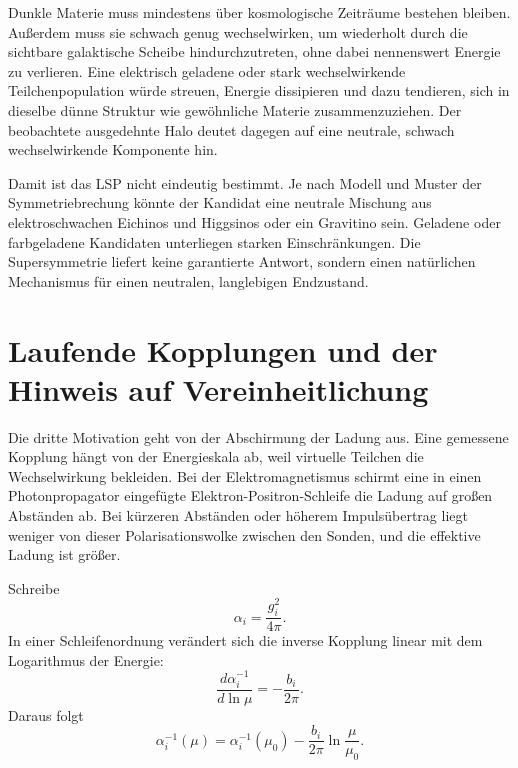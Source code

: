 Dunkle Materie muss mindestens über kosmologische Zeiträume bestehen bleiben. Außerdem muss sie schwach genug wechselwirken, um wiederholt durch die sichtbare galaktische Scheibe hindurchzutreten, ohne dabei nennenswert Energie zu verlieren. Eine elektrisch geladene oder stark wechselwirkende Teilchenpopulation würde streuen, Energie dissipieren und dazu tendieren, sich in dieselbe dünne Struktur wie gewöhnliche Materie zusammenzuziehen. Der beobachtete ausgedehnte Halo deutet dagegen auf eine neutrale, schwach wechselwirkende Komponente hin.

Damit ist das LSP nicht eindeutig bestimmt. Je nach Modell und Muster der Symmetriebrechung könnte der Kandidat eine neutrale Mischung aus elektroschwachen Eichinos und Higgsinos oder ein Gravitino sein. Geladene oder farbgeladene Kandidaten unterliegen starken Einschränkungen. Die Supersymmetrie liefert keine garantierte Antwort, sondern einen natürlichen Mechanismus für einen neutralen, langlebigen Endzustand.

\section{Laufende Kopplungen und der Hinweis auf Vereinheitlichung}

Die dritte Motivation geht von der Abschirmung der Ladung aus. Eine gemessene Kopplung hängt von der Energieskala ab, weil virtuelle Teilchen die Wechselwirkung bekleiden. Bei der Elektromagnetismus schirmt eine in einen Photonpropagator eingefügte Elektron-Positron-Schleife die Ladung auf großen Abständen ab. Bei kürzeren Abständen oder höherem Impulsübertrag liegt weniger von dieser Polarisationswolke zwischen den Sonden, und die effektive Ladung ist größer.

Schreibe
\begin{equation}
\alpha_i=\frac{g_i^2}{4\pi}.
\end{equation}
In einer Schleifenordnung verändert sich die inverse Kopplung linear mit dem Logarithmus der Energie:
\begin{equation}
\frac{d\alpha_i^{-1}}{d\ln\mu}
=-\frac{b_i}{2\pi}.
\end{equation}
Daraus folgt
\begin{equation}
\alpha_i^{-1}(\mu)
=\alpha_i^{-1}(\mu_0)
-\frac{b_i}{2\pi}\ln\frac{\mu}{\mu_0}.
\end{equation}

